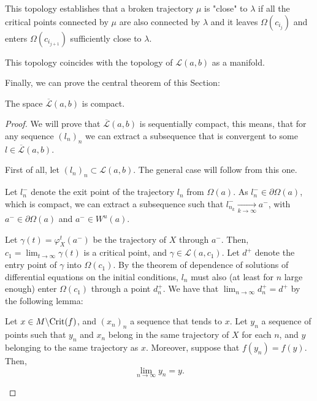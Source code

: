 This topology establishes that a broken trajectory $\mu$ is "close" to $\lambda$ if all the critical points connected by $\mu$ are also connected by $\lambda$ and it leaves $\Omega(c_{i_j})$ and enters $\Omega(c_{i_{j+1}})$ sufficiently close to $\lambda$.

\begin{rmrk}
This topology coincides with the topology of $\mathcal{L}(a,b)$ as a manifold.
\end{rmrk}

Finally, we can prove the central theorem of this Section:

\begin{theo}
The space $\overline{\mathcal{L}}(a,b)$ is compact.
\end{theo}

\begin{proof}
We will prove that $\overline{\mathcal{L}}(a,b)$ is sequentially compact, this means, that for any sequence $(l_n)_n$ we can extract a subsequence that is convergent to some $l \in \overline{\mathcal{L}}(a,b)$.

First of all, let $(l_n)_n \subset \mathcal{L}(a,b)$. The general case will follow from this one.

Let $l_n^{-}$ denote the exit point of the trajectory $l_n$ from $\Omega(a)$. As $l_n^- \in \partial \Omega(a)$, which is compact, we can extract a subsequence such that $l_{n_k}^- \xrightarrow[k \rightarrow \infty]{} a^-$, with $a^- \in \partial \Omega(a)$ and $a^- \in W^u(a)$.

Let $\gamma(t) = \varphi^t_X(a^-)$ be the trajectory of $X$ through $a^-$. Then, $c_1 = \displaystyle\lim_{t \rightarrow \infty} \gamma(t)$ is a critical point, and $\gamma \in \mathcal{L}(a,c_1)$. Let $d^+$ denote the entry point of $\gamma$ into $\Omega(c_1)$. By the theorem of dependence of solutions of differential equations on the initial conditions, $l_n$ must also (at least for $n$ large enough) enter $\Omega(c_1)$ through a point $d_n^+$. We have that $\displaystyle\lim_{n \rightarrow \infty} d_n^+ = d^+$ by the following lemma:

\begin{lema} \label{morse_sequences}
Let $x \in M \backslash \text{Crit}(f)$, and $(x_n)_n$ a sequence that tends to $x$. Let $y_n$ a sequence of points such that $y_n$ and $x_n$ belong in the same trajectory of $X$ for each $n$, and $y$ belonging to the same trajectory as $x$. Moreover, suppose that $f(y_n) = f(y)$. Then,
$$\lim_{n \rightarrow \infty} y_n = y .$$
\end{lema}


\end{proof}
